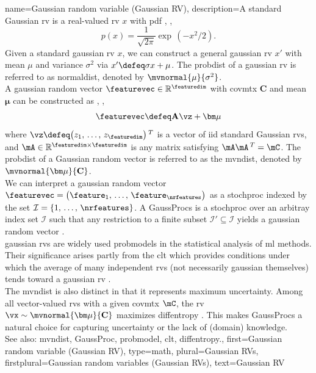 {name={Gaussian random variable (Gaussian RV)}, 
	description={A  standard Gaussian \gls{rv} is a 
		real-valued \gls{rv} $x$ with \gls{pdf} \cite{BertsekasProb}, \cite{GrayProbBook}, \cite{papoulis}
		\begin{equation}
			\nonumber
			p(x) = \frac{1}{\sqrt{2\pi}} \exp\,(-x^2/2). 
		\end{equation}
		Given a standard \gls{gaussian} \gls{rv} $x$, we can construct a general \gls{gaussian} 
		\gls{rv} $x'$ with \gls{mean} $\mu$ and \gls{variance} $\sigma^2$ via $x' \defeq \sigma x + \mu$. 
		The \gls{probdist} of a \gls{gaussian} \gls{rv} is referred to as \gls{normaldist}, 
		denoted by $\mvnormal{\mu}{\sigma^{2}}$. 
		\\ 
		A \gls{gaussian} random \gls{vector} $\featurevec \in \mathbb{R}^{\featuredim}$ with 
		\gls{covmtx} $\mathbf{C}$ and \gls{mean} ${\bm \mu}$ can be constructed as \cite{GrayProbBook}, \cite{papoulis}, \cite{Lapidoth09}
		\[
		\featurevec \defeq \mathbf{A} \vz + {\bm \mu}
		\]
		where $\vz \defeq \big( z_{1}, \,\ldots, \,z_{\featuredim} \big)\,^{T}$ is a \gls{vector} 
		of \gls{iid} standard Gaussian \glspl{rv}, and $\mA \in \mathbb{R}^{\featuredim \times \featuredim}$ is any \gls{matrix} satisfying $\mA \mA\,^{T} = \mC$. 
		The \gls{probdist} of a Gaussian random \gls{vector} is referred to as the \gls{mvndist}, 
		denoted by $\mvnormal{\bm \mu}{\mathbf{C}}$.
		\\
		We can interpret a \gls{gaussian} random \gls{vector} $\featurevec=\big(\feature_{1},\,\ldots,\,\feature_{\nrfeatures}\big)$ as a \gls{stochproc} 
		indexed by the set $\mathcal{I}=\{1,\,\ldots,\,\nrfeatures\}$. A \glspl{GaussProc} is a 
		\gls{stochproc} over an arbitray index set $\mathcal{I}$ such that any restriction 
		to a finite subset $\mathcal{I}' \subseteq \mathcal{I}$ yields a \gls{gaussian} 
		random \gls{vector} \cite{Rasmussen2006Gaussian}.
  		\\
        		\Gls{gaussian} \glspl{rv} are widely used \glspl{probmodel} in the 
				statistical analysis of \gls{ml} methods. Their significance arises 
				partly from the \gls{clt} which provides conditions under which 
				the average of many independent \glspl{rv} (not necessarily \gls{gaussian} themselves) 
				tends toward a \gls{gaussian} \gls{rv} \cite{ross2013first}.
		\\ 
		The \gls{mvndist} is also distinct in that it represents \gls{maximum} \gls{uncertainty}. 
		Among all \gls{vector}-valued \glspl{rv} with a given \gls{covmtx} $\mC$, the 
		\gls{rv} $\vx \sim \mvnormal{\bm \mu}{\mathbf{C}}$ maximizes \gls{diffentropy} 
		\cite[Th. 8.6.5]{coverthomas}. This makes \glspl{GaussProc} a natural choice for 
		capturing \gls{uncertainty} or the lack of (domain) knowledge.
		\\ 
		See also: \gls{mvndist}, \gls{GaussProc}, \gls{probmodel}, \gls{clt}, \gls{diffentropy}.},
	first={Gaussian random variable (Gaussian RV)},
	type=math, 
	plural={Gaussian RVs}, 
	firstplural={Gaussian random variables (Gaussian RVs)}, 
	text={Gaussian RV}
}

